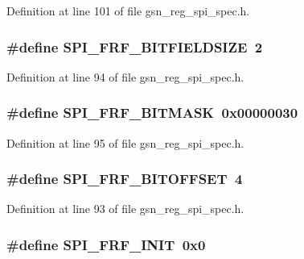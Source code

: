Definition at line 101 of file gsn\_\-reg\_\-spi\_\-spec.h.

\hypertarget{a00573_ac58086f3e76986eb3e2edabf1bdd9dd4}{
\subsubsection[{SPI\_\-FRF\_\-BITFIELDSIZE}]{\setlength{\rightskip}{0pt plus 5cm}\#define SPI\_\-FRF\_\-BITFIELDSIZE~2}}
\label{a00573_ac58086f3e76986eb3e2edabf1bdd9dd4}


Definition at line 94 of file gsn\_\-reg\_\-spi\_\-spec.h.

\hypertarget{a00573_a92556c02dd2f6ae5c71b63c07acd3628}{
\subsubsection[{SPI\_\-FRF\_\-BITMASK}]{\setlength{\rightskip}{0pt plus 5cm}\#define SPI\_\-FRF\_\-BITMASK~0x00000030}}
\label{a00573_a92556c02dd2f6ae5c71b63c07acd3628}


Definition at line 95 of file gsn\_\-reg\_\-spi\_\-spec.h.

\hypertarget{a00573_abb932c58cfef04fc0a939d7c25624b70}{
\subsubsection[{SPI\_\-FRF\_\-BITOFFSET}]{\setlength{\rightskip}{0pt plus 5cm}\#define SPI\_\-FRF\_\-BITOFFSET~4}}
\label{a00573_abb932c58cfef04fc0a939d7c25624b70}


Definition at line 93 of file gsn\_\-reg\_\-spi\_\-spec.h.

\hypertarget{a00573_a4c9e5acb1fbb254d7bb8a00760edee09}{
\subsubsection[{SPI\_\-FRF\_\-INIT}]{\setlength{\rightskip}{0pt plus 5cm}\#define SPI\_\-FRF\_\-INIT~0x0}}
\label{a00573_a4c9e5acb1fbb254d7bb8a00760edee09}


